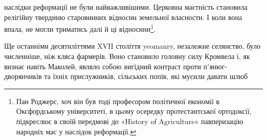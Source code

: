 наслідки реформації не були найважливішими. Церковна
маєтність становила релігійну твердиню старовинних відносин
земельної власности. І коли вона впала, не могли триматись
далі й ці відносини\footnote{
Пан Роджерс, хоч він був тоді професором політичної економії в
Оксфордському університеті, в цьому осередку протестантської ортодоксії,
підкреслює в своїй передмові до «History of Agriculture» павперизацію
народніх мас у наслідок реформації.
}.

Ще останніми десятиліттями XVII століття yeomanry, незалежне
селянство, було численніше, ніж кляса фармерів. Воно
становило головну силу Кромвела і, як визнає навіть Маколей,
являло собою вигідний контраст проти п’янюг-дворянчиків та
їхніх прислужників, сільських попів, які мусили давати шлюб
\parbreak{}  %
